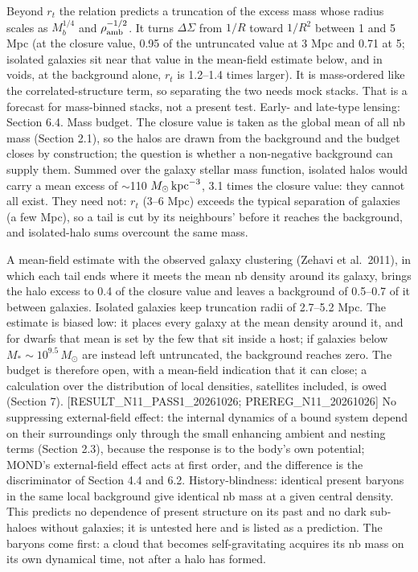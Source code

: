 \documentclass[
  10pt,
]{article}
\begin{document}
Beyond $r_t$ the relation predicts a truncation of the excess mass whose radius scales as $M_b^{1/4}$ and $\rho_{\rm amb}^{-1/2}$. It turns $\Delta\Sigma$ from $1/R$ toward $1/R^2$ between 1 and 5 Mpc (at the closure value, 0.95 of the untruncated value at 3 Mpc and 0.71 at 5; isolated galaxies sit near that value in the mean-field estimate below, and in voids, at the background alone, $r_t$ is 1.2--1.4 times larger). It is mass-ordered like the correlated-structure term, so separating the two needs mock stacks. That is a forecast for mass-binned stacks, not a present test. Early- and late-type lensing: Section 6.4. Mass budget. The closure value is taken as the global mean of all nb mass (Section 2.1), so the halos are drawn from the background and the budget closes by construction; the question is whether a non-negative background can supply them. Summed over the galaxy stellar mass function, isolated halos would carry a mean excess of $\sim$110 $M_\odot\,{\rm kpc}^{-3}$, 3.1 times the closure value: they cannot all exist. They need not: $r_t$ (3--6 Mpc) exceeds the typical separation of galaxies (a few Mpc), so a tail is cut by its neighbours' before it reaches the background, and isolated-halo sums overcount the same mass.

A mean-field estimate with the observed galaxy clustering (Zehavi et al.~2011), in which each tail ends where it meets the mean nb density around its galaxy, brings the halo excess to 0.4 of the closure value and leaves a background of 0.5--0.7 of it between galaxies. Isolated galaxies keep truncation radii of 2.7--5.2 Mpc. The estimate is biased low: it places every galaxy at the mean density around it, and for dwarfs that mean is set by the few that sit inside a host; if galaxies below $M_*\sim10^{9.5}\,M_\odot$ are instead left untruncated, the background reaches zero. The budget is therefore open, with a mean-field indication that it can close; a calculation over the distribution of local densities, satellites included, is owed (Section 7). {[}RESULT\_N11\_PASS1\_20261026; PREREG\_N11\_20261026{]} No suppressing external-field effect: the internal dynamics of a bound system depend on their surroundings only through the small enhancing ambient and nesting terms (Section 2.3), because the response is to the body's own potential; MOND's external-field effect acts at first order, and the difference is the discriminator of Section 4.4 and 6.2. History-blindness: identical present baryons in the same local background give identical nb mass at a given central density. This predicts no dependence of present structure on its past and no dark sub-haloes without galaxies; it is untested here and is listed as a prediction. The baryons come first: a cloud that becomes self-gravitating acquires its nb mass on its own dynamical time, not after a halo has formed.
\end{document}

